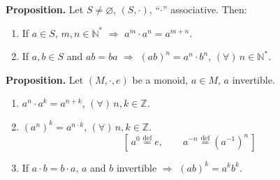 \documentclass[12pt]{article}
\begin{document}
\noindent\textbf{Proposition.} Let $S \neq \varnothing$, $(S,\cdot)$, ``$\cdot$'' associative. Then:
\begin{enumerate}
\item[(1)] If $a \in S$, $m,n \in \mathbb{N}^*$ $\Rightarrow$ $a^m \cdot a^n = a^{m+n}$.
\item[(2)] If $a,b \in S$ and $ab=ba$ $\Rightarrow$ $(ab)^n = a^n \cdot b^n$, $(\forall)\, n \in \mathbb{N}^*$.
\end{enumerate}

\noindent\textbf{Proposition.} Let $(M,\cdot,e)$ be a monoid, $a \in M$, $a$ invertible.
\begin{enumerate}
\item[(1)] $a^n \cdot a^k = a^{n+k}$, $(\forall)\, n,k \in \mathbb{Z}$.
\item[(2)] $(a^n)^k = a^{n\cdot k}$, $(\forall)\, n,k \in \mathbb{Z}$.
\[
\left[\, a^0 \overset{\text{def}}{=} e, \qquad a^{-n} \overset{\text{def}}{=} (a^{-1})^n \,\right]
\]
\item[(3)] If $a\cdot b = b\cdot a$, $a$ and $b$ invertible $\Rightarrow$ $(ab)^k = a^k b^k$.
\end{enumerate}
\end{document}
